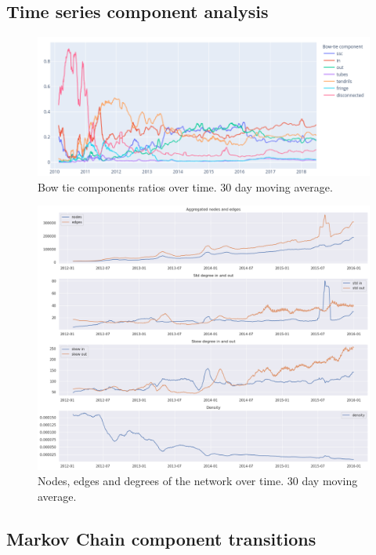 \documentclass{Resources/netsci-project}
\begin{document}
\lipsum[1]

\subsection{Time series component analysis}

\lipsum[1]

\begin{figure}[!htb]
    \centering
    \includegraphics[width=0.9\linewidth]{Resources/bowtie_relative.png}
    \caption{Bow tie components ratios over time. 30 day moving average.} 
\end{figure}

\lipsum[1]

\begin{figure}[!htb]
    \centering
    \includegraphics[width=0.9\linewidth]{Resources/Network_basic_prop_overtime.png}
    \caption{Nodes, edges and degrees of the network over time. 30 day moving average.} 
\end{figure}

\lipsum[1]

\subsection{Markov Chain component transitions}
\end{document}
